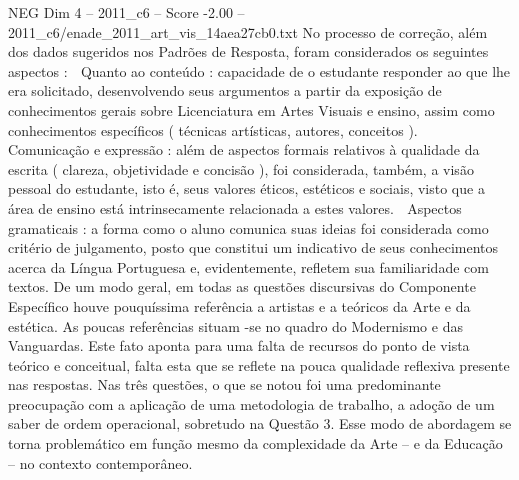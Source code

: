 \begin{textsample}{NEG Dim 4 – 2011\_c6 – Score -2.00 – 2011\_c6/enade\_2011\_art\_vis\_14aea27cb0.txt}
No processo de correção, além dos dados sugeridos nos Padrões de Resposta, foram considerados os seguintes aspectos :  Quanto ao conteúdo : capacidade de o estudante responder ao que lhe era solicitado, desenvolvendo seus argumentos a partir da exposição de conhecimentos gerais sobre Licenciatura em Artes Visuais e ensino, assim como conhecimentos específicos ( técnicas artísticas, autores, conceitos ).  Comunicação e expressão : além de aspectos formais relativos à qualidade da escrita ( clareza, objetividade e concisão ), foi considerada, também, a visão pessoal do estudante, isto é, seus valores éticos, estéticos e sociais, visto que a área de ensino está intrinsecamente relacionada a estes valores.  Aspectos gramaticais : a forma como o aluno comunica suas ideias foi considerada como critério de julgamento, posto que constitui um indicativo de seus conhecimentos acerca da Língua Portuguesa e, evidentemente, refletem sua familiaridade com textos.
De um modo geral, em todas as questões discursivas do Componente Específico houve pouquíssima referência a artistas e a teóricos da Arte e da estética.
As poucas referências situam -se no quadro do Modernismo e das Vanguardas.
Este fato aponta para uma falta de recursos do ponto de vista teórico e conceitual, falta esta que se reflete na pouca qualidade reflexiva presente nas respostas.
Nas três questões, o que se notou foi uma predominante preocupação com a aplicação de uma metodologia de trabalho, a adoção de um saber de ordem operacional, sobretudo na Questão 3.
Esse modo de abordagem se torna problemático em função mesmo da complexidade da Arte – e da Educação – no contexto contemporâneo.

\end{textsample}
